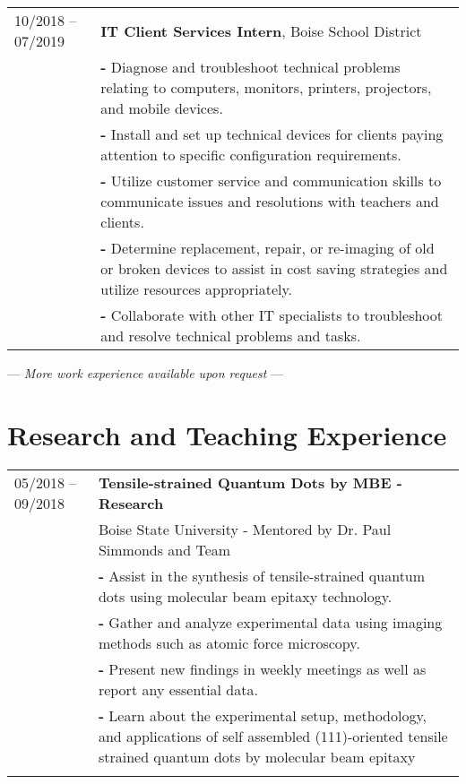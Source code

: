 \documentclass[a4paper,12pt]{article}
\begin{document}
\begin{tabularx}{\linewidth}{lX}
10/2018 -- 07/2019 & \textbf{IT Client Services Intern}, Boise School District\\
         & \textbf{-} Diagnose and troubleshoot technical problems relating to computers, monitors, printers, projectors, and mobile devices. \\
         & \textbf{-} Install and set up technical devices for clients paying attention to specific configuration requirements. \\
         & \textbf{-} Utilize customer service and communication skills to communicate issues and resolutions with teachers and clients.\\
         & \textbf{-} Determine replacement, repair, or re-imaging of old or broken devices to assist in cost saving strategies and utilize resources appropriately. \\
         & \textbf{-} Collaborate with other IT specialists to troubleshoot and resolve technical problems and tasks.\\
\end{tabularx}

\begin{center}
--- \textit{More work experience available upon request} --- \\
\end{center}


\section{Research and Teaching Experience}

\begin{tabularx}{\linewidth}{lX}
05/2018 -- 09/2018  & \textbf{Tensile-strained Quantum Dots by MBE - Research} \\
& Boise State University - Mentored by Dr. Paul Simmonds and Team\\
         & \textbf{-} Assist in the synthesis of tensile-strained quantum dots using molecular beam epitaxy technology.\\
         & \textbf{-} Gather and analyze experimental data using imaging methods such as atomic force microscopy. \\
         & \textbf{-} Present new findings in weekly meetings as well as report any essential data. \\
         & \textbf{-} Learn  about the experimental setup, methodology, and applications of self assembled (111)-oriented tensile strained quantum dots by molecular beam epitaxy \\
         \\
\end{tabularx}
\end{document}
